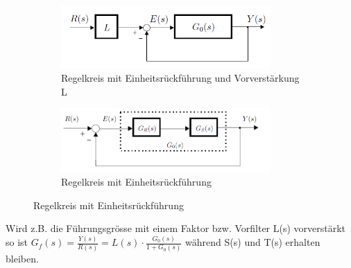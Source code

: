 \begin{figure}[h]
	\begin{center}
	\begin{subfigure}[b]{8cm}
		\centering
		\includegraphics[width=8cm]{./images/regelkreismitL.png}
		\caption{Regelkreis mit Einheitsrückführung und Vorverstärkung L}
	\end{subfigure}\qquad
	\begin{subfigure}[b]{8cm}
		\centering
		\includegraphics[width=8cm]{./images/RegelkreisEinheitsrueckfuehrung.png}
		\caption{Regelkreis mit Einheitsrückführung}
	\end{subfigure}
	\end{center}
\end{figure}
	Wird z.B. die Führungsgrösse mit einem Faktor bzw. Vorfilter L(s) vorverstärkt so ist $G_f(s)=\frac{Y(s)}{R(s)}=L(s)\cdot\frac{G_0(s)}{1+G_0(s)}$ während S(s) und T(s) erhalten bleiben.
%

